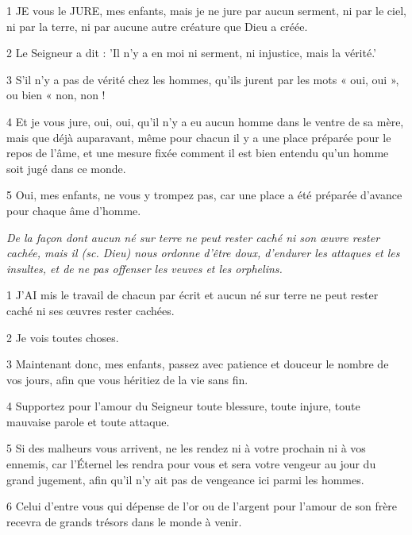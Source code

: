 \par 1 JE vous le JURE, mes enfants, mais je ne jure par aucun serment, ni par le ciel, ni par la terre, ni par aucune autre créature que Dieu a créée.

\par 2 Le Seigneur a dit : 'Il n'y a en moi ni serment, ni injustice, mais la vérité.'

\par 3 S'il n'y a pas de vérité chez les hommes, qu'ils jurent par les mots « oui, oui », ou bien « non, non !

\par 4 Et je vous jure, oui, oui, qu'il n'y a eu aucun homme dans le ventre de sa mère, mais que déjà auparavant, même pour chacun il y a une place préparée pour le repos de l'âme, et une mesure fixée comment il est bien entendu qu'un homme soit jugé dans ce monde.

\par 5 Oui, mes enfants, ne vous y trompez pas, car une place a été préparée d'avance pour chaque âme d'homme.


\par \textit{De la façon dont aucun né sur terre ne peut rester caché ni son œuvre rester cachée, mais il (sc. Dieu) nous ordonne d'être doux, d'endurer les attaques et les insultes, et de ne pas offenser les veuves et les orphelins.}

\par 1 J'AI mis le travail de chacun par écrit et aucun né sur terre ne peut rester caché ni ses œuvres rester cachées.

\par 2 Je vois toutes choses.

\par 3 Maintenant donc, mes enfants, passez avec patience et douceur le nombre de vos jours, afin que vous héritiez de la vie sans fin.

\par 4 Supportez pour l'amour du Seigneur toute blessure, toute injure, toute mauvaise parole et toute attaque.

\par 5 Si des malheurs vous arrivent, ne les rendez ni à votre prochain ni à vos ennemis, car l'Éternel les rendra pour vous et sera votre vengeur au jour du grand jugement, afin qu'il n'y ait pas de vengeance ici parmi les hommes.

\par 6 Celui d'entre vous qui dépense de l'or ou de l'argent pour l'amour de son frère recevra de grands trésors dans le monde à venir.

